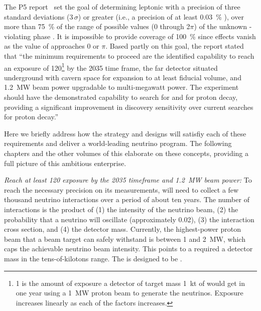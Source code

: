The P5 report~\cite{p5report} set the goal of %
determining leptonic  with a precision of three standard deviations (\num{3}$\,\sigma$) or greater (i.e., a precision of at least \SI{0.03}{\%} ), over more than \SI{75}{\%}   of the range of possible values  (0 through 2$\pi$) of the unknown -violating phase \deltacp. It is impossible to provide coverage of \SI{100}{\%}  since  effects vanish as the value of \deltacp approaches $0$ or $\pi$. 
 Based partly on this goal, the report stated that ``the 
minimum requirements to proceed are the identified capability to reach an exposure 
of \SI{120}{\ktMWyr}\footnote{\SI{1}{\ktMWyr} is the amount of exposure a detector of target mass \SI{1}{kt} of  would get in one year using a \SI{1}{MW} proton beam to generate the neutrinos. Exposure increases linearly as each of the factors increases.}
 by the 2035 time frame, the far detector situated underground 
with cavern space for expansion to at least \fdfiducialmass {} fiducial volume, and \SI{1.2}{MW} beam power upgradable to multi-megawatt power.
The experiment should have the demonstrated 
capability to search for  and for proton decay, providing a significant 
improvement in discovery sensitivity over current searches for proton decay.'' %


Here we briefly address how the  strategy and designs will satisfiy each of these requirements and deliver a world-leading neutrino program. %
The following chapters and the other volumes of this  elaborate on these concepts, providing a full picture of this ambitious enterprise. 

\textit{Reach at least \SI{120}{\msr} exposure by the 2035 timeframe and \SI{1.2}{\MW} beam power: } To reach the necessary precision on its measurements,  will need to collect a few thousand neutrino interactions over a period of about ten years. The number of interactions is the product of (1) the intensity of the neutrino beam, (2) the probability that a neutrino will oscillate (approximately \num{0.02}), (3) the interaction cross section, and (4) the detector mass.  Currently, the highest-power proton beam that a beam target can safely withstand is between \num{1} and \SI{2}{\MW}, which caps the achievable neutrino beam intensity. This points to a required a detector mass in the tens-of-kilotons range. The   is designed to be \fdfiducialmass{}.

